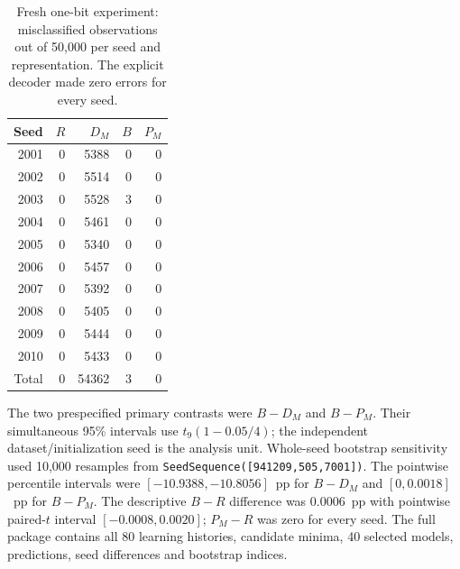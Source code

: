 \begin{table}[ht]
\centering\small
\caption{Fresh one-bit experiment: misclassified observations out of 50,000 per seed and representation. The explicit decoder made zero errors for every seed.}
\label{supp:tab:bit-seeds}
\begin{tabular}{rrrrr}
\toprule
Seed & $R$ & $D_M$ & $B$ & $P_M$\\
\midrule
2001&0&5388&0&0\\
2002&0&5514&0&0\\
2003&0&5528&3&0\\
2004&0&5461&0&0\\
2005&0&5340&0&0\\
2006&0&5457&0&0\\
2007&0&5392&0&0\\
2008&0&5405&0&0\\
2009&0&5444&0&0\\
2010&0&5433&0&0\\
\midrule
Total&0&54362&3&0\\
\bottomrule
\end{tabular}
\end{table}

The two prespecified primary contrasts were $B-D_M$ and $B-P_M$. Their simultaneous 95\% intervals use $t_9(1-0.05/4)$; the independent dataset/initialization seed is the analysis unit. Whole-seed bootstrap sensitivity used 10,000 resamples from \texttt{SeedSequence([941209,505,7001])}. The pointwise percentile intervals were $[-10.9388,-10.8056]$~pp for $B-D_M$ and $[0,0.0018]$~pp for $B-P_M$. The descriptive $B-R$ difference was $0.0006$~pp with pointwise paired-$t$ interval $[-0.0008,0.0020]$; $P_M-R$ was zero for every seed. The full package contains all 80 learning histories, candidate minima, 40 selected models, predictions, seed differences and bootstrap indices.
